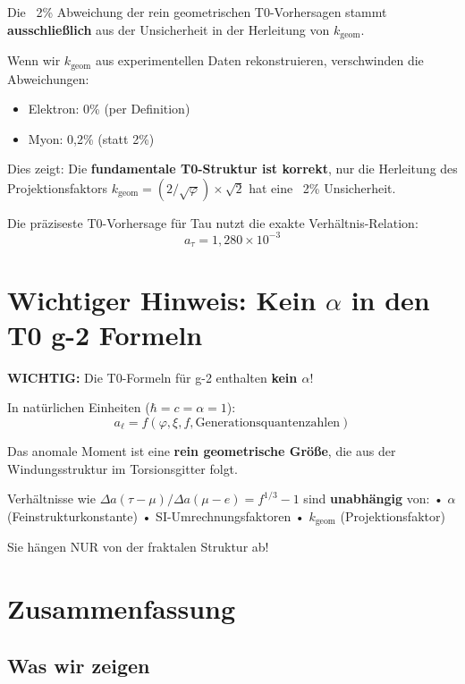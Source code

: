	\begin{keypoint}[Kernaussage]
		Die ~2\% Abweichung der rein geometrischen T0-Vorhersagen stammt \textbf{ausschließlich} aus der Unsicherheit in der Herleitung von $k_{\text{geom}}$.
		
		Wenn wir $k_{\text{geom}}$ aus experimentellen Daten rekonstruieren, verschwinden die Abweichungen:
		\begin{itemize}
			\item Elektron: 0\% (per Definition)
			\item Myon: 0{,}2\% (statt 2\%)
		\end{itemize}
		
		Dies zeigt: Die \textbf{fundamentale T0-Struktur ist korrekt}, nur die Herleitung des Projektionsfaktors $k_{\text{geom}} = (2/\sqrt{\varphi}) \times \sqrt{2}$ hat eine ~2\% Unsicherheit.
		
		Die präziseste T0-Vorhersage für Tau nutzt die exakte Verhältnis-Relation:
		\begin{equation}
			\boxed{a_\tau = 1{,}280 \times 10^{-3}}
		\end{equation}
	\end{keypoint}	
	\section{Wichtiger Hinweis: Kein $\alpha$ in den T0 g-2 Formeln}
	
	\textbf{WICHTIG:}
	Die T0-Formeln für g-2 enthalten \textbf{kein $\alpha$}!
	
	In natürlichen Einheiten ($\hbar = c = \alpha = 1$):
	\[ a_\ell = f(\varphi, \xi, f, \text{Generationsquantenzahlen}) \]
	
	Das anomale Moment ist eine \textbf{rein geometrische Größe},
	die aus der Windungsstruktur im Torsionsgitter folgt.
	
	Verhältnisse wie $\Delta a(\tau-\mu)/\Delta a(\mu-e) = f^{1/3} - 1$ sind
	\textbf{unabhängig} von:
	• $\alpha$ (Feinstrukturkonstante)
	• SI-Umrechnungsfaktoren
	• $k_{\text{geom}}$ (Projektionsfaktor)
	
	Sie hängen NUR von der fraktalen Struktur ab!
	\section{Zusammenfassung}
	
	\subsection{Was wir zeigen}
	
